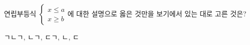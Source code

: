 연립부등식 $\begin{cases} x\le a \\ x\ge b \end{cases}$에 대한 설명으로 옳은 것만을 보기에서 있는 대로 고른 것은?
\begin{choices32}{ㄱ}{ㄴ}{ㄱ, ㄴ}{ㄱ, ㄷ}{ㄱ, ㄴ, ㄷ}\end{choices32}
